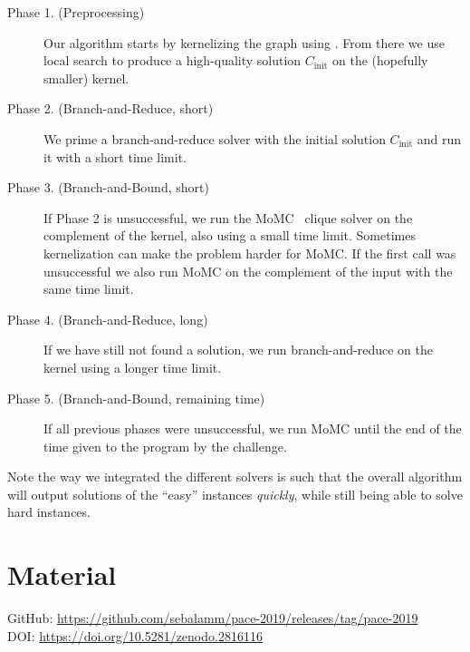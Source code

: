 \documentclass[a4paper,UKenglish]{lipics-v2016}
\begin{document}

%

\begin{description}
\item[Phase 1. (Preprocessing)] Our algorithm starts by kernelizing the graph using \cite{DBLP:conf/alenex/Hespe0S18}. 
From there we use local search to produce a high-quality solution $C_{\text{init}}$ on the (hopefully smaller) kernel. 
\item[Phase 2. (Branch-and-Reduce, short)]
We prime a branch-and-reduce solver with the initial solution $C_{\text{init}}$ and run it with a short time limit.
\item[Phase 3. (Branch-and-Bound, short)]
If Phase 2 is unsuccessful, we run the MoMC~\cite{DBLP:journals/cor/LiJM17} clique solver on the complement of the kernel, also using a small time limit. Sometimes kernelization can make the problem harder for MoMC. If the first call was unsuccessful we also run MoMC on the complement of the input with the same time limit.

\item[Phase 4. (Branch-and-Reduce, long)]
If we have still not found a solution, we run branch-and-reduce on the kernel using a longer time limit. 

\item[Phase 5. (Branch-and-Bound, remaining time)]
If all previous phases were unsuccessful, we run MoMC until the end of the time given to the program by the challenge.
\end{description}

Note the way we integrated the different solvers is such that the overall algorithm will output solutions of the ``easy'' instances \emph{quickly}, while still being able to solve hard instances.
\section{Material}
GitHub: \url{https://github.com/sebalamm/pace-2019/releases/tag/pace-2019} \\
DOI: \url{https://doi.org/10.5281/zenodo.2816116}


\end{document}
